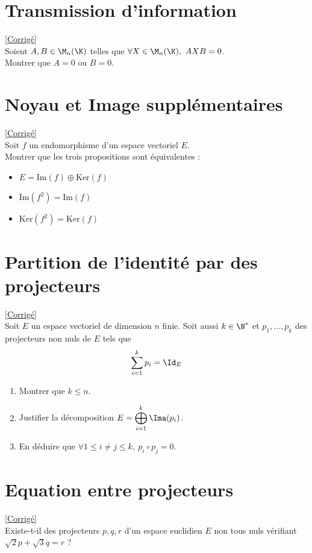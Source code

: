 \documentclass[8pt]{book}
\begin{document}
\section{Transmission d'information }
\label{Transmission d'information}
\textcolor{blue}{\hyperref[Transmission d'information corrigé]{[Corrigé]}}\\
Soient $A,B\in \M_n(\K)$ telles que $\forall X\in \M_n(\K),\ AXB=0$.\\
Montrer que $A=0$ ou $B=0$.

\section{Noyau et Image supplémentaires }
\label{Condition nécessaire et suffisante pour que l'image et le noyau soient supplémentaires}
\textcolor{blue}{\hyperref[Condition nécessaire et suffisante pour que l'image et le noyau soient supplémentaires corrigé]{[Corrigé]}}\\
Soit $f$ un endomorphisme d'un espace vectoriel $E$.\\
Montrer que les trois propositions sont équivalentes :
\begin{itemize}
	\item $E=\text{Im}(f)\oplus \text{Ker}(f)$
	\item $\text{Im}(f^2)=\text{Im}(f)$
	\item $\text{Ker}(f^2)=\text{Ker}(f)$
\end{itemize}

\section{Partition de l'identité par des projecteurs }
\label{Partition de l'identité par des projecteurs}
\textcolor{blue}{\hyperref[Partition de l'identité par des projecteurs corrigé]{[Corrigé]}}\\
Soit $E$ un espace vectoriel de dimension $n$ finie. Soit aussi $k\in \N^*$ et $p_1,\dots,p_k$ des projecteurs non nuls de $E$ tels que
$$\sum_{i=1}^kp_i=\Id_E$$
\begin{enumerate}
	\item Montrer que $k\leq n$.
	\item Justifier la décomposition $E=\displaystyle\bigoplus_{i=1}^k\Ima(p_i)$.
	\item En déduire que $\forall 1\leq i\ne j\leq k,\ p_i\circ p_j=0$.
\end{enumerate}
	
\section{Equation entre projecteurs }
\label{Equation entre projecteurs}
\textcolor{blue}{\hyperref[Equation entre projecteurs corrigé]{[Corrigé]}}\\
Existe-t-il des projecteurs $p,q,r$ d'un espace euclidien $E$ non tous nuls vérifiant $\sqrt{2}p+\sqrt{3}q=r$ ?
\end{document}
